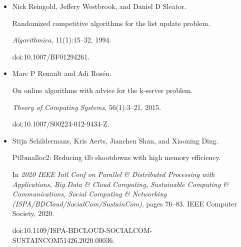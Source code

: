 \begin{itemize}
Sharath Raghvendra and Rachita Sowle.


A Scalable Work Function Algorithm for the k-Server Problem.


In \emph{18th Scandinavian Symposium and Workshops on Algorithm Theory
(SWAT 2022)}, volume 227 of \emph{Leibniz International Proceedings in
Informatics (LIPIcs)}, pages 30:1–30:20. Schloss Dagstuhl – Leibniz-Zentrum
für Informatik, 2022.


doi:10.4230/LIPIcs.SWAT.2022.30.





\item[] 
[32]

Nick Reingold, Jeffery Westbrook, and Daniel D Sleator.


Randomized competitive algorithms for the list update problem.


\emph{Algorithmica}, 11(1):15–32, 1994.


doi:10.1007/BF01294261.





\item[] 
[33]

Marc P Renault and Adi Rosén.


On online algorithms with advice for the k-server problem.


\emph{Theory of Computing Systems}, 56(1):3–21, 2015.


doi:10.1007/S00224-012-9434-Z.





\item[] 
[34]

Stijn Schildermans, Kris Aerts, Jianchen Shan, and Xiaoning Ding.


Ptlbmalloc2: Reducing tlb shootdowns with high memory efficiency.


In \emph{2020 IEEE Intl Conf on Parallel \& Distributed Processing
with Applications, Big Data \& Cloud Computing, Sustainable Computing \&
Communications, Social Computing \& Networking
(ISPA/BDCloud/SocialCom/SustainCom)}, pages 76–83. IEEE Computer Society,
2020.


doi:10.1109/ISPA-BDCLOUD-SOCIALCOM-SUSTAINCOM51426.2020.00036.





\end{itemize}




